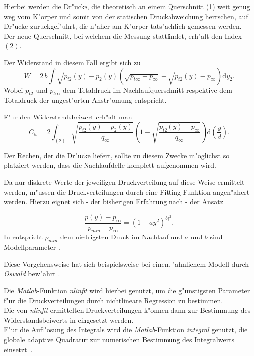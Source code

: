 Hierbei werden die Dr"ucke, die theoretisch an einem Querschnitt (1)  weit genug weg vom K"orper und somit von der statischen Druckabweichung herrschen, auf Dr"ucke zuruckgef"uhrt, die n"aher am K"orper tats"achlich gemessen werden\cite{Schlichting.2001}.
Der neue Querschnitt, bei welchem die Messung stattfindet, erh"alt den Index $(2)$.

Der Widerstand in diesem Fall ergibt sich zu
\begin{equation}
	\label{eq:widerstand_korrigiert}
	W = 2\,b \int \sqrt{p_{t2}(y) - p_2(y)} \left(\sqrt{p_{t\infty} - p_{\infty}} - \sqrt{p_{t2}(y) - p_{\infty}}\right) \mathrm{d} y_2 .
\end{equation}
Wobei $p_{t2}$ und $p_{t\infty}$ dem Totaldruck im Nachlaufquerschnitt respektive dem Totaldruck der ungest"orten Anstr"omung entspricht.

F"ur den Widerstandsbeiwert erh"alt man
\begin{equation}
	\label{eq:C_w_korrigiert}
	C_w = 2 \int_{(2)} \sqrt{\frac{p_{t2}(y) - p_2(y)}{q_{\infty}}}
	\left(1 - \sqrt{\frac{p_{t2}(y) - p_{\infty}}{q_{\infty}}}\right)  \mathrm{d}\left(\frac{y}{d}\right).
\end{equation}

Der Rechen, der die Dr"ucke liefert, sollte zu diesem Zwecke m"oglichst so platziert werden, dass die Nachlaufdelle komplett aufgenommen wird. 

Da nur diskrete Werte der jeweiligen Druckverteilung auf diese Weise ermittelt werden, m"ussen die Druckverteilungen durch eine Fitting-Funktion angen"ahert werden. 
Hierzu eignet sich - der bisherigen Erfahrung nach - der Ansatz

	\begin{equation}
	\label{eq:fitting-function}
	\frac{p(y) - p_{\infty}}{p_{min}-p_{\infty}} = (1 +ay^2)^{by^2}.
	\end{equation}
In  entspricht $p_{min}$ dem niedrigsten Druck im Nachlauf und $a$ und $b$ sind Modellparameter \cite{Oswald.2017}.

Diese Vorgehensweise hat sich beispielsweise bei einem "ahnlichem Modell durch \textit{Oswald} bew"ahrt \cite{Oswald.2017}.

Die \textit{Matlab}-Funktion \textit{nlinfit} wird hierbei genutzt, um die g"unstigsten Parameter f"ur die Druckverteilungen durch nichtlineare Regression zu bestimmen.\\
Die von \textit{nlinfit} ermittelten Druckverteilungen k"onnen dann zur Bestimmung des Widerstandsbeiwerts in  eingesetzt werden.\\
F"ur die Aufl"osung des Integrals wird die \textit{Matlab}-Funktion \textit{integral} genutzt, die globale adaptive Quadratur zur numerischen Bestimmung des Integralwerts einsetzt~\cite{Oswald.2017}.

